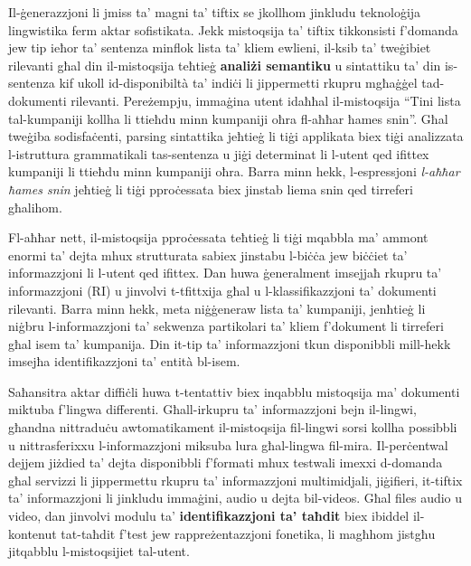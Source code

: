 \documentclass[]{../../metanetpaper}
\begin{document}
\begin{multicols}{2}

Il-ġenerazzjoni li jmiss ta’ magni ta’ tiftix se jkollhom jinkludu teknoloġija lingwistika ferm aktar sofistikata. Jekk mistoqsija ta’ tiftix tikkonsisti f’domanda jew tip ieħor ta’ sentenza minflok lista ta’ kliem ewlieni, il-ksib ta’ tweġibiet rilevanti għal din il-mistoqsija teħtieġ \textbf{analiżi semantiku} u sintattiku ta’ din is-sentenza kif ukoll id-disponibiltà ta’ indiċi li jippermetti rkupru mgħaġġel tad-dokumenti rilevanti. Pereżempju, immaġina utent idaħħal il-mistoqsija “Tini lista tal-kumpaniji kollha li ttieħdu minn kumpaniji oħra fl-aħħar ħames snin”. Għal tweġiba sodisfaċenti, parsing sintattika jeħtieġ li tiġi applikata biex tiġi analizzata l-istruttura grammatikali tas-sentenza u jiġi determinat li l-utent qed ifittex kumpaniji li ttieħdu minn kumpaniji oħra. Barra minn hekk, l-espressjoni \emph{l-aħħar ħames snin} jeħtieġ li tiġi pproċessata biex jinstab liema snin qed tirreferi għalihom.

Fl-aħħar nett, il-mistoqsija pproċessata teħtieġ li tiġi mqabbla ma’ ammont enormi ta’ dejta mhux strutturata sabiex jinstabu l-biċċa jew biċċiet ta’ informazzjoni li l-utent qed ifittex. Dan huwa ġeneralment imsejjaħ rkupru ta’ informazzjoni (RI) u jinvolvi t-tfittxija għal u l-klassifikazzjoni ta’ dokumenti rilevanti. Barra minn hekk, meta niġġeneraw lista ta’ kumpaniji, jenħtieġ li niġbru l-informazzjoni ta’ sekwenza partikolari ta’ kliem f'dokument li tirreferi għal isem ta’ kumpanija. Din it-tip ta’ informazzjoni tkun disponibbli mill-hekk imsejħa identifikazzjoni ta’ entità bl-isem.

Saħansitra aktar diffiċli huwa t-tentattiv biex inqabblu mistoqsija ma’ dokumenti miktuba f'lingwa differenti. Għall-irkupru ta’ informazzjoni bejn il-lingwi, għandna nittraduċu awtomatikament il-mistoqsija fil-lingwi sorsi kollha possibbli u nittrasferixxu l-informazzjoni miksuba lura għal-lingwa fil-mira. Il-perċentwal dejjem jiżdied ta’ dejta disponibbli f'formati mhux testwali imexxi d-domanda għal servizzi li jippermettu rkupru ta’ informazzjoni multimidjali, jiġifieri, it-tiftix ta’ informazzjoni li jinkludu immaġini, audio u dejta bil-videos. Għal files audio u video, dan jinvolvi modulu ta’ \textbf{identifikazzjoni ta’ taħdit} biex ibiddel il-kontenut tat-taħdit f’test jew rappreżentazzjoni fonetika, li magħhom jistgħu jitqabblu l-mistoqsijiet tal-utent.


\end{multicols}
\end{document}
